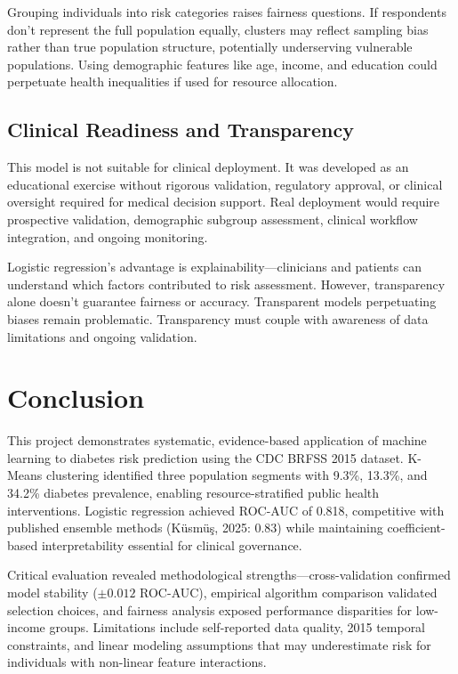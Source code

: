 \documentclass[12pt,a4paper]{article}
\begin{document}
Grouping individuals into risk categories raises fairness questions. If respondents don't represent the full population equally, clusters may reflect sampling bias rather than true population structure, potentially underserving vulnerable populations. Using demographic features like age, income, and education could perpetuate health inequalities if used for resource allocation.

\subsection{Clinical Readiness and Transparency}

This model is not suitable for clinical deployment. It was developed as an educational exercise without rigorous validation, regulatory approval, or clinical oversight required for medical decision support. Real deployment would require prospective validation, demographic subgroup assessment, clinical workflow integration, and ongoing monitoring.

Logistic regression's advantage is explainability—clinicians and patients can understand which factors contributed to risk assessment. However, transparency alone doesn't guarantee fairness or accuracy. Transparent models perpetuating biases remain problematic. Transparency must couple with awareness of data limitations and ongoing validation.



\section{Conclusion}

This project demonstrates systematic, evidence-based application of machine learning to diabetes risk prediction using the CDC BRFSS 2015 dataset. K-Means clustering identified three population segments with 9.3\%, 13.3\%, and 34.2\% diabetes prevalence, enabling resource-stratified public health interventions. Logistic regression achieved ROC-AUC of 0.818, competitive with published ensemble methods (Küsmüş, 2025: 0.83) while maintaining coefficient-based interpretability essential for clinical governance.

Critical evaluation revealed methodological strengths—cross-validation confirmed model stability ($\pm 0.012$ ROC-AUC), empirical algorithm comparison validated selection choices, and fairness analysis exposed performance disparities for low-income groups. Limitations include self-reported data quality, 2015 temporal constraints, and linear modeling assumptions that may underestimate risk for individuals with non-linear feature interactions.
\end{document}
